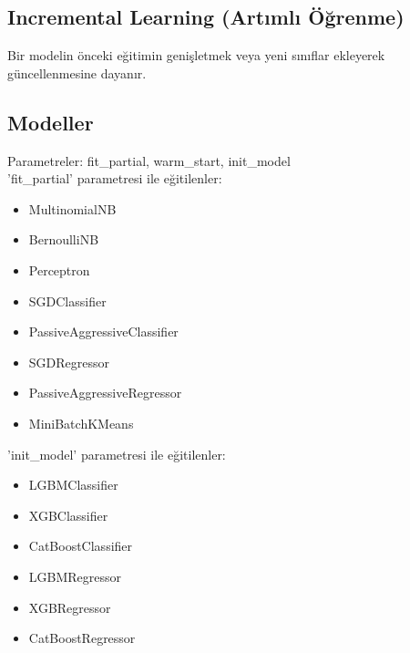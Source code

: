 \subsection{Incremental Learning (Artımlı Öğrenme)}
Bir modelin önceki eğitimin genişletmek veya yeni sınıflar ekleyerek güncellenmesine dayanır.

\subsection{Modeller}
Parametreler: fit\_partial, warm\_start, init\_model \\
'fit\_partial' parametresi ile eğitilenler:
\begin{itemize}
    \item MultinomialNB
    \item BernoulliNB
    \item Perceptron
    \item SGDClassifier
    \item PassiveAggressiveClassifier
    \item SGDRegressor
    \item PassiveAggressiveRegressor
    \item MiniBatchKMeans
\end{itemize}

'init\_model' parametresi ile eğitilenler:
\begin{itemize}
    \item LGBMClassifier
    \item XGBClassifier
    \item CatBoostClassifier
    \item LGBMRegressor
    \item XGBRegressor
    \item CatBoostRegressor
\end{itemize}

\newpage